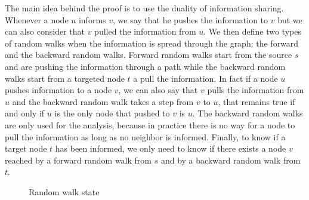 \documentclass[10pt,journal,a4paper]{IEEEtran}
\begin{document}
The main idea behind the proof is to use the duality of information sharing. Whenever a node $u$ informs $v$, we say that he pushes the information to $v$ but we can also consider that $v$ pulled the information from $u$. We then define two types of random walks when the information is spread through the graph: the forward and the backward random walks. Forward random walks start from the source $s$ and are pushing the information through a path while the backward random walks start from a targeted node $t$ a pull the information. In fact if a node $u$ pushes information to a node $v$, we can also say that $v$ pulls the information from $u$ and the backward random walk takes a step from $v$ to $u$, that remains true if and only if $u$ is the only node that pushed to $v$ is $u$. The backward random walks are only used for the analysis, because in practice there is no way for a node to pull the information as long as no neighbor is informed. Finally, to know if a target node $t$ has been informed, we only need to know if there exists a node $v$ reached by a forward random walk from $s$ and by a backward random walk from $t$.


\begin{figure}[h]
\centering
{}
\caption{Random walk state}
\label{fig:lazyFSM}
\end{figure}
\end{document}
